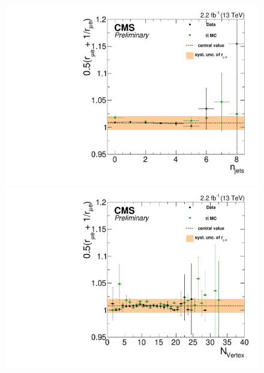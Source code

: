 \begin{figure}[htbp]
  \begin{minipage}[t]{0.3\textwidth}
    \includegraphics[width=\textwidth]{bkgd/figs/rSFOFFromRMuE_ZPeakControlCentral_Run2015_25ns_NJets_None.pdf}
  \end{minipage}
  \begin{minipage}[t]{0.3\textwidth}
    \includegraphics[width=\textwidth]{bkgd/figs/rSFOFFromRMuE_ZPeakControlCentral_Run2015_25ns_nVtx_None.pdf}
  \end{minipage}
  \begin{minipage}[t]{0.3\textwidth}

\end{minipage}
\end{figure}
